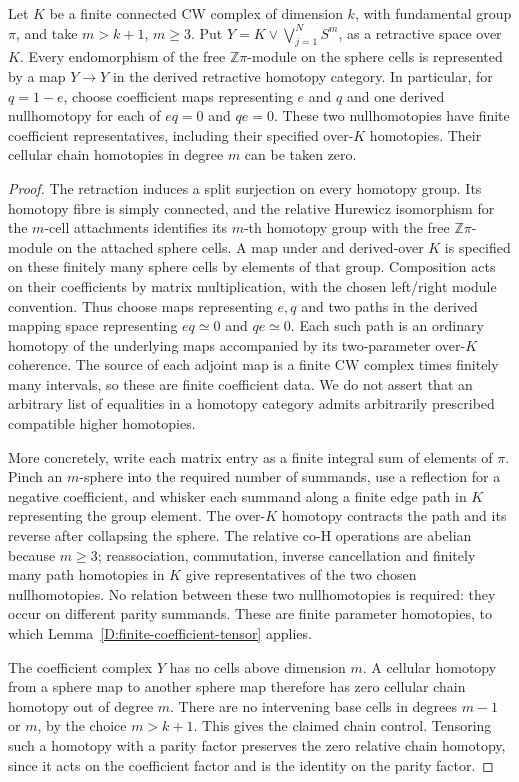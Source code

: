 \begin{lemma}
\label{D:coefficient-matrices}
Let $K$ be a finite connected CW complex of dimension $k$, with
fundamental group $\pi$, and take $m>k+1$, $m\geq3$.
Put $Y=K\vee\bigvee_{j=1}^N S^m$, as a retractive space over $K$.
Every endomorphism of the free $\mathbb Z\pi$-module on the sphere
cells is represented by a map $Y\to Y$ in the derived retractive
homotopy category.  In particular, for $q=1-e$, choose coefficient maps representing
$e$ and $q$ and one derived nullhomotopy for each of $eq=0$ and
$qe=0$.  These two nullhomotopies have finite coefficient
representatives, including their specified over-$K$ homotopies.
Their cellular chain homotopies in degree $m$ can be taken zero.
\end{lemma}
\begin{proof}
The retraction induces a split surjection on every homotopy group.
Its homotopy fibre is simply connected, and the relative Hurewicz
isomorphism for the $m$-cell attachments identifies its $m$-th
homotopy group with the free $\mathbb Z\pi$-module on the attached
sphere cells.  A map under and derived-over $K$ is specified on
these finitely many sphere cells by elements of that group.
Composition acts on their coefficients by matrix multiplication,
with the chosen left/right module convention.  Thus choose maps representing $e,q$ and two paths in the derived
mapping space representing $eq\simeq0$ and $qe\simeq0$.  Each such
path is an ordinary homotopy of the underlying maps accompanied
by its two-parameter over-$K$ coherence.  The source of each
adjoint map is a finite CW complex times finitely many intervals,
so these are finite coefficient data.  We do not assert that an
arbitrary list of equalities in a homotopy category admits
arbitrarily prescribed compatible higher homotopies.

More concretely, write each matrix entry as a finite integral sum
of elements of $\pi$.  Pinch an $m$-sphere into the required number
of summands, use a reflection for a negative coefficient, and
whisker each summand along a finite edge path in $K$ representing
the group element.  The over-$K$ homotopy contracts the path and
its reverse after collapsing the sphere.  The relative co-H
operations are abelian because $m\geq3$; reassociation,
commutation, inverse cancellation and finitely many path
homotopies in $K$ give representatives of the two chosen
nullhomotopies.  No relation between these two nullhomotopies
is required: they occur on different parity summands.
These are finite parameter homotopies, to which
Lemma~\ref{D:finite-coefficient-tensor} applies.

The coefficient complex $Y$ has no cells above dimension $m$.
A cellular homotopy from a sphere map to another sphere map
therefore has zero cellular chain homotopy out of degree $m$.
There are no intervening base cells in degrees $m-1$ or $m$,
by the choice $m>k+1$.  This gives the claimed chain control.
Tensoring such a homotopy with a parity factor preserves the
zero relative chain homotopy, since it acts on the coefficient
factor and is the identity on the parity factor.
\end{proof}

